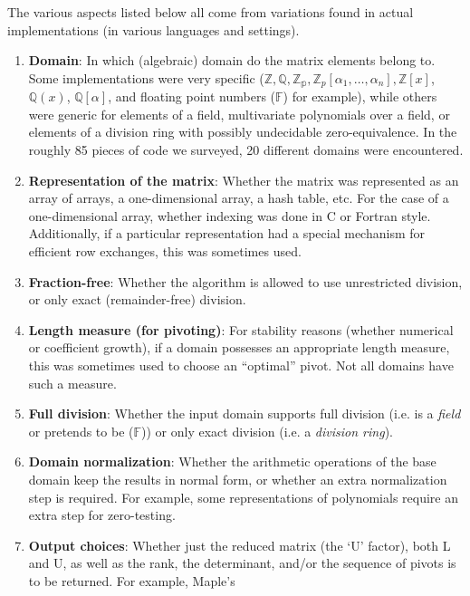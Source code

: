 \documentclass[draft]{elsart}
\newcommand{\floats}{\mathbb{F}}
\begin{document}
The various aspects listed below all come from variations found in actual
implementations (in various languages and settings).

\begin{enumerate}
	\item \textbf{Domain}: In which (algebraic) domain do the matrix
		elements belong to.  Some implementations were very specific
		($\mathbb{Z}, \mathbb{Q}, \mathbb{Z_p}, 
		\mathbb{Z}_p\left[\alpha_1,\ldots,\alpha_n\right], 
		\mathbb{Z}\left[x\right]$, $\mathbb{Q}\left(x\right)$, 
		$\mathbb{Q}\left[\alpha\right]$, and floating point numbers 
		($\floats$) for 
		example), while others were generic for elements of a field,
		multivariate polynomials over a field, or elements of a division ring
		with possibly undecidable zero-equivalence.  In the roughly 85 pieces
		of code we surveyed, 20 different domains were encountered.
	\item \textbf{Representation of the matrix}: Whether the matrix
		was represented as an array of arrays, a one-dimensional array,
		a hash table, etc.  For the case of a one-dimensional array,
		whether indexing was done in C or Fortran style.  Additionally,
		if a particular representation had a special mechanism for efficient
		row exchanges, this was sometimes used.
	\item \textbf{Fraction-free}: Whether the 
		algorithm is allowed to use unrestricted division, or only
		exact (remainder-free) division.
	\item \textbf{Length measure (for pivoting)}:  For stability reasons
		(whether numerical or coefficient growth), if a domain possesses
		an appropriate length measure, this was sometimes used to choose
		an ``optimal'' pivot.  Not all domains have such a measure.
	\item \textbf{Full division}: Whether the input domain supports full
		division (i.e. is a \emph{field} or pretends to be ($\floats$)) 
		or only exact division (i.e. a \emph{division ring}).
	\item \textbf{Domain normalization}: Whether the arithmetic operations
		of the base domain keep the results in normal form, or whether
		an extra normalization step is required.  For example, some 
		representations of polynomials require an extra step for
		zero-testing.
	\item \textbf{Output choices}:  Whether just the reduced matrix
		(the `U' factor), both L and U, as well as
		the rank, the determinant, and/or the sequence of 
		pivots is to be returned.  For example, Maple's

\end{enumerate}
\end{document}
